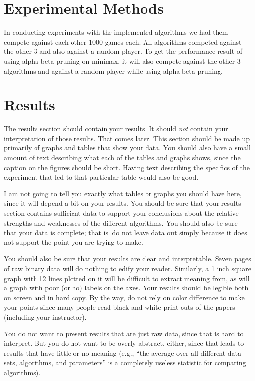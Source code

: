 \documentclass[12pt,letterpaper]{article}
\begin{document}
\section{Experimental Methods}
In conducting experiments with the implemented algorithms we had them compete against each other 1000 games each. All algorithms competed against the other 3 and also against a random player. To get the performance result of using alpha beta pruning on minimax, it will also compete against the other 3 algorithms and against a random player while using alpha beta pruning. 


\newpage
\section{Results}

The results section should contain your results.  It should \emph{not} contain
your interpretation of those results.  That comes later.  This section should be
made up primarily of graphs and tables that show your data.  You should also
have a small amount of text describing what each of the tables and graphs shows,
since the caption on the figures should be short.  Having text describing the
specifics of the experiment that led to that particular table would also be
good.  

I am not going to tell you exactly what tables or graphs you should have here,
since it will depend a bit on your results.  You should be sure that your
results section contains sufficient data to support your conclusions about the
relative strengths and weaknesses of the different algorithms.  You should also
be sure that your data is complete; that is, do not leave data out simply because
it does not support the point you are trying to make.

You should also be sure that your results are clear and interpretable.  Seven
pages of raw binary data will do nothing to edify your reader.  Similarly, a
1 inch square graph with 12 lines plotted on it will be difficult to extract
meaning from, as will a graph with poor (or no) labels on the axes.  Your
results should be legible both on screen and in hard copy. By the way, do
not rely on color difference to make your points since many people read
black-and-white print outs of the papers (including your instructor).

You do not want to present results that are just raw data, since that is hard to
interpret.  But you do not want to be overly abstract, either, since that leads to
results that have little or no meaning (e.g., ``the average over all different
data sets, algorithms, and parameters'' is a completely useless statistic for
comparing algorithms).
\end{document}
